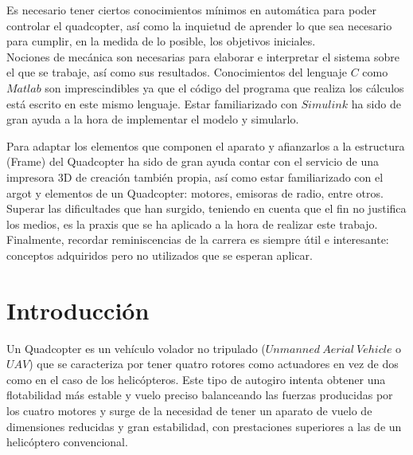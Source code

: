 \documentclass[twoside,11pt]{book}
\begin{document}
Es necesario tener ciertos conocimientos mínimos en automática para poder controlar el quadcopter, así como la inquietud de aprender lo que sea necesario para cumplir, en la medida de lo posible, los objetivos iniciales. \\

Nociones de mecánica son necesarias para elaborar e interpretar el sistema sobre el que se trabaje, así como sus resultados. Conocimientos del lenguaje $C$ como $Matlab$ son imprescindibles ya que el código del programa que realiza los cálculos está escrito en este mismo lenguaje. Estar familiarizado con $Simulink$ ha sido de gran ayuda a la hora de implementar el modelo y simularlo. 

Para adaptar los elementos que componen el aparato y afianzarlos a la estructura (Frame)  del Quadcopter ha sido de gran ayuda contar con el servicio de una impresora 3D de creación también propia, así como estar familiarizado con el argot y elementos de un Quadcopter: motores, emisoras de radio, entre otros. \\

Superar las dificultades que han surgido, teniendo en cuenta que el fin no justifica los medios, es la praxis que se ha aplicado a la hora de realizar este trabajo. Finalmente, recordar reminiscencias de la carrera es siempre útil e interesante: conceptos adquiridos pero no utilizados que se esperan aplicar.
 
\newpage
\chapter{Introducción} \label{intro}

Un Quadcopter es un vehículo volador no tripulado ($Unmanned \>Aerial\>Vehicle$ o $UAV$) que se caracteriza por tener quatro rotores como actuadores en vez de dos como en el caso de los helicópteros. Este tipo de autogiro intenta obtener una flotabilidad más estable y vuelo preciso balanceando las fuerzas producidas por los cuatro motores y surge de la necesidad de tener un aparato de vuelo de dimensiones reducidas y gran estabilidad, con prestaciones superiores a las de un helicóptero convencional. \\
\end{document}
